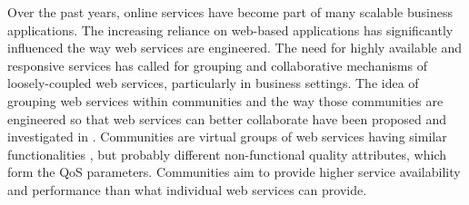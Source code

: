 Over the past years, online services have become part of many
scalable business applications. The increasing reliance on
web-based applications has significantly influenced the way web
services are engineered.
The need for highly available and responsive services has called
for grouping and collaborative mechanisms of loosely-coupled web
services, particularly in business settings. The idea of grouping
web services within communities and the way those communities are
engineered so that web services can better collaborate have been
proposed and investigated in
\cite{DBLP:journals/ijebr/MaamarSTBB09,DBLP:journals/internet/BenatallahSD03,Rosario:2008:PQS:1512146.1512290}.
Communities are virtual groups of web services having similar
functionalities \cite{Zeng:2003:QDW:775152.775211,
Paik:2005:TSS:2229263.2230038,Medjahed05adynamic,10.1109/ARES.2008.7},
but probably different non-functional quality attributes, which
form the QoS parameters.
Communities aim to provide higher service
availability and performance than what individual web services can
provide.


